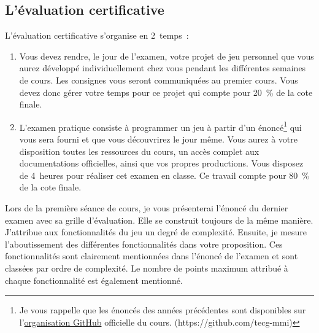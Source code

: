 \subsection{L’évaluation certificative}
\label{eval_certificative}
L’évaluation certificative s'organise en 2~temps~:
\begin{enumerate}
    \item Vous devez rendre, le jour de l'examen, votre projet de jeu personnel que vous aurez développé individuellement chez vous pendant les différentes semaines de cours. Les consignes vous seront communiquées au premier cours. Vous devez donc gérer votre temps pour ce projet qui compte pour 20~\% de la cote finale.
    \item L'examen pratique consiste à programmer un jeu à partir d'un énoncé\footnote{Je vous rappelle que les énoncés des années précédentes sont disponibles sur l'\href{https://github.com/tecg-mmi}{organisation GitHub} officielle du cours. (https://github.com/tecg-mmi)} qui vous sera fourni et que vous découvrirez le jour même. Vous aurez à votre disposition toutes les ressources du cours, un accès complet aux documentations officielles, ainsi que vos propres productions. Vous disposez de 4~heures pour réaliser cet examen en classe. Ce travail compte pour 80~\% de la cote finale.
\end{enumerate}
Lors de la première séance de cours, je vous présenterai l'énoncé du dernier examen avec sa grille d'évaluation. Elle se construit toujours de la même manière. J'attribue aux fonctionnalités du jeu un degré de complexité. Ensuite, je mesure l'aboutissement des différentes fonctionnalités dans votre proposition. Ces fonctionnalités sont clairement mentionnées dans l'énoncé de l'examen et sont classées par ordre de complexité. Le nombre de points maximum attribué à chaque fonctionnalité est également mentionné.


